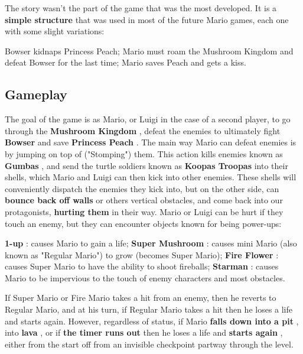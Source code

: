\documentclass[a4paper,10pt]{book}
\begin{document}
 The story wasn't the part of the game that was the most developed. It
          is a  \textbf{simple structure }  that was used in most of the future Mario games,
          each one with some slight variations:
           
 Bowser kidnaps Princess Peach; 
 Mario must roam the Mushroom Kingdom and defeat Bowser for the
              last time; 
 Mario saves Peach and gets a kiss. 
 
 
 
 
 \subsection{Gameplay }
 The goal of the game is as Mario, or Luigi in the case of a
          second player, to go through the  \textbf{Mushroom Kingdom } , defeat the enemies
          to ultimately fight  \textbf{Bowser }  and save  \textbf{Princess Peach } . The main way Mario
          can defeat enemies is by jumping on top of ("Stomping") them. This
          action kills enemies known as  \textbf{Gumbas } , and send the turtle soldiers
          known as  \textbf{Koopas Troopas }  into their shells, which Mario and Luigi can
          then kick into other enemies. These shells will conveniently dispatch
          the enemies they kick into, but on the other side, can  \textbf{bounce back off walls } 
          or others vertical obstacles, and come back into our protagonists,
           \textbf{hurting them }  in their way.  
 Mario or Luigi can be hurt if they touch an enemy, but they can
          encounter objects known for being power-ups: 
 
 
 \textbf{1-up } : causes Mario to gain a life; 
 \textbf{Super Mushroom } : causes mini Mario (also known as "Regular
                      Mario") to grow (becomes Super Mario); 
 \textbf{Fire Flower } : causes Super Mario to have the ability to shoot
                      fireballs; 
 \textbf{Starman } : causes Mario to be impervious to the touch of enemy
                      characters and most obstacles. 
 
 
 
 
 
 If Super
          Mario or Fire Mario takes a hit from an enemy, then he reverts to
          Regular Mario, and at his turn, if Regular Mario takes a hit then he
          loses a life and starts again. However, regardless of status, if Mario
           \textbf{falls down into a pit } , into  \textbf{lava } , or if  \textbf{the timer runs
          out }  then he loses a life and  \textbf{starts again } , either from the
          start off from an invisible checkpoint partway through the level. 
\end{document}
